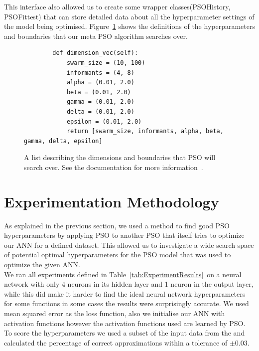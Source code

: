 \documentclass[12pt]{article}
\begin{document}
This interface also allowed us to create some wrapper classes(PSOHistory, PSOFittest) that can store detailed data about all the hyperparameter settings of the model being optimised.
Figure~\ref{fig:dimensionVec} shows the definitions of  the hyperparameters and boundaries that our meta PSO algorithm searches over. 

\begin{figure}[h]
    \begin{verbatim}
        def dimension_vec(self):
            swarm_size = (10, 100)
            informants = (4, 8)
            alpha = (0.01, 2.0)
            beta = (0.01, 2.0)
            gamma = (0.01, 2.0)
            delta = (0.01, 2.0)
            epsilon = (0.01, 2.0)
            return [swarm_size, informants, alpha, beta, gamma, delta, epsilon]
    \end{verbatim}
    \caption{A list describing the dimensions and boundaries that PSO will search over. See the documentation for more information~\autocite{fay-huntBiologicallyInspiredComputation}.}
    \label{fig:dimensionVec}
\end{figure}


\newpage
\section{Experimentation Methodology}\label{sec:experiment}

As explained in the previous section, we used a method to find good PSO hyperparameters by applying PSO to another PSO that itself tries to optimize our ANN for a defined dataset.
This allowed us to investigate a wide search space of potential optimal hyperparameters for the PSO model that was used to optimize the given ANN.\\

We ran all experiments defined in Table~\ref{tab:ExperimentResults}~on a neural network with only 4 neurons in its hidden layer and 1 neuron in the output layer, while this did make it harder to find the ideal neural network hyperparameters for some functions in some cases the results were surprisingly accurate.
We used mean squared error as the loss function, also we initialise our ANN with activation functions however the activation functions used are learned by PSO.\\

To score the hyperparameters we used a subset of the input data from the and calculated the percentage of correct approximations within a tolerance of $\pm 0.03$.
\end{document}
